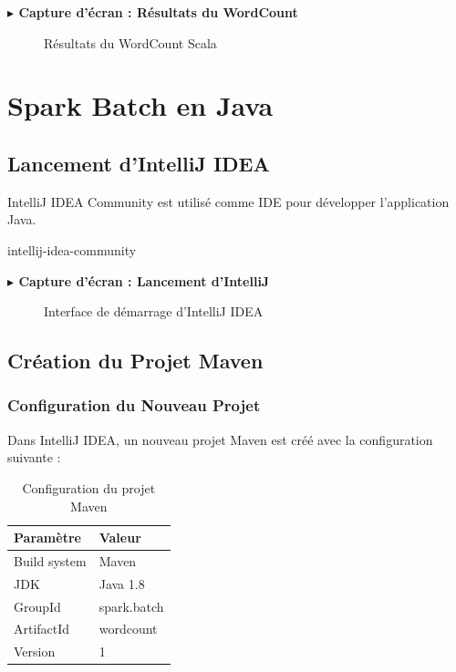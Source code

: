 \documentclass[12pt,a4paper]{report}
\newcommand{\etape}[1]{\vspace{6pt}\textbf{\color{bleuESP}$\blacktriangleright$ #1}\vspace{4pt}}
\begin{document}
\etape{Capture d'écran : Résultats du WordCount}
\begin{figure}[H]
  \centering
  \caption{Résultats du WordCount Scala}
\end{figure}

\chapter{Spark Batch en Java}

\section{Lancement d'IntelliJ IDEA}

IntelliJ IDEA Community est utilisé comme IDE pour développer l'application Java.

\begin{cmdbox}
intellij-idea-community
\end{cmdbox}

\etape{Capture d'écran : Lancement d'IntelliJ}
\begin{figure}[H]
  \centering
  \caption{Interface de démarrage d'IntelliJ IDEA}
\end{figure}

\section{Création du Projet Maven}

\subsection{Configuration du Nouveau Projet}

Dans IntelliJ IDEA, un nouveau projet Maven est créé avec la configuration suivante :

\begin{table}[H]
\centering
\begin{tabular}{|l|l|}
\hline
\rowcolor{bleuESP!20}
\textbf{Paramètre} & \textbf{Valeur} \\
\hline
Build system & Maven \\
\hline
JDK & Java 1.8 \\
\hline
GroupId & spark.batch \\
\hline
ArtifactId & wordcount \\
\hline
Version & 1 \\
\hline
\end{tabular}
\caption{Configuration du projet Maven}
\end{table}
\end{document}
